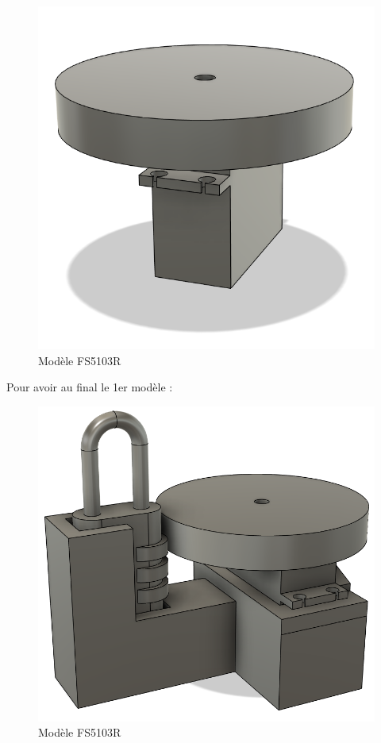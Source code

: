 \documentclass[twoside]{article}
\begin{document}
\begin{multicols}{2}
\begin{figure}[H]
\centering
\includegraphics[scale=0.3]{FS5103R_BasicWheels.png}
\caption{Modèle FS5103R}
\end{figure}
Pour avoir au final le 1er modèle : 

\begin{figure}[H]
\centering
\includegraphics[scale=0.3]{1stStructure.png}
\caption{Modèle FS5103R}
\end{figure}


\end{multicols}
\end{document}
